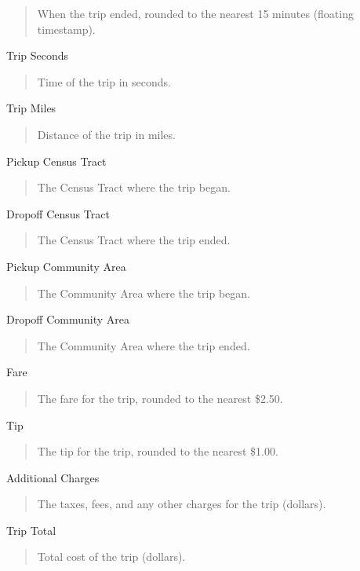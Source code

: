 \documentclass[]{article}
\begin{document}
\begin{quote}
When the trip ended, rounded to the nearest 15 minutes (floating
timestamp).
\end{quote}

Trip Seconds

\begin{quote}
Time of the trip in seconds.
\end{quote}

Trip Miles

\begin{quote}
Distance of the trip in miles.
\end{quote}

Pickup Census Tract

\begin{quote}
The Census Tract where the trip began.
\end{quote}

Dropoff Census Tract

\begin{quote}
The Census Tract where the trip ended.
\end{quote}

Pickup Community Area

\begin{quote}
The Community Area where the trip began.
\end{quote}

Dropoff Community Area

\begin{quote}
The Community Area where the trip ended.
\end{quote}

Fare

\begin{quote}
The fare for the trip, rounded to the nearest \$2.50.
\end{quote}

Tip

\begin{quote}
The tip for the trip, rounded to the nearest \$1.00.
\end{quote}

Additional Charges

\begin{quote}
The taxes, fees, and any other charges for the trip (dollars).
\end{quote}

Trip Total

\begin{quote}
Total cost of the trip (dollars).
\end{quote}
\end{document}

